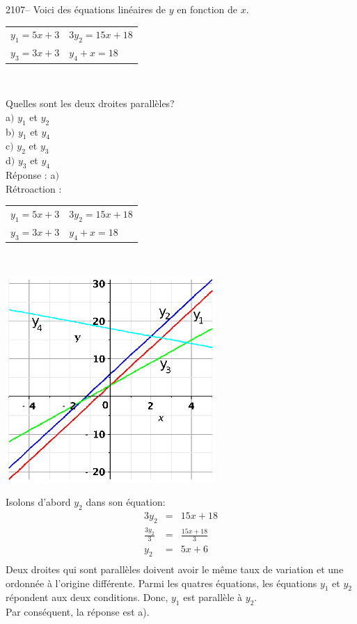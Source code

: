 \documentclass[letterpaper, 12pt]{article}
\begin{document}
2107-- Voici des \'equations lin\'eaires de $y$ en fonction de $x$.
\begin{center}
\begin{tabular}{l l}
 $ y_{1}=5x+3 $ &  $ 3y_{2}=15x+18 $ \\
 $ y_{3}=3x+3 $ &  $ y_{4}+x=18 $ \\
\end{tabular}\\
\end{center}
Quelles sont les deux droites parall\`eles? \\

a$)$ $ y_{1}$ et $ y_{2}$\\
b$)$ $ y_{1}$ et $ y_{4}$\\
c$)$ $ y_{2}$ et $ y_{3}$\\
d$)$ $ y_{3}$ et $ y_{4}$\\

R\'eponse : a$)$\\

R\'etroaction :\\
\begin{center}
\begin{tabular}{l l}
 $ y_{1}=5x+3 $ &  $ 3y_{2}=15x+18 $ \\
 $ y_{3}=3x+3 $ &  $ y_{4}+x=18 $ \\
\end{tabular}\\
\end{center}
\begin{center}
 \includegraphics[width=8cm,bb=14 14 215 215]{Q2107.eps}
\end{center}
Isolons d'abord $y_{2}$ dans son \'equation:
\begin{eqnarray*}
 3y_{2}&=&15x+18\\[2mm]
\frac{3y_{2}}{3}&=&\frac{15x+18}{3}\\[2mm]
y_{2}&=&5x+6\\[2mm]
\end{eqnarray*}
Deux droites qui sont parall\`eles doivent avoir le m\^eme taux de variation et une ordonn\'ee \`a l'origine diff\'erente. Parmi les quatres \'equations, les \'equations $ y_{1}$ et $ y_{2}$ r\'epondent aux deux conditions. Donc, $ y_{1}$ est parall\`ele \`a $ y_{2}$.\\
Par cons\'equent, la r\'eponse est a).\\
\end{document}
